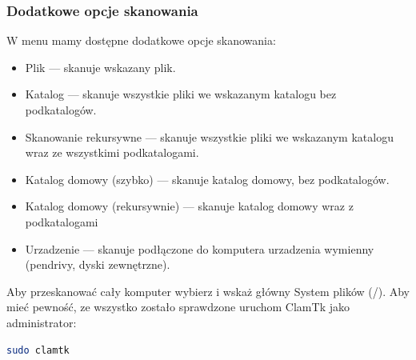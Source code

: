 \subsubsection{Dodatkowe opcje skanowania}
W menu  mamy dostępne dodatkowe opcje skanowania:
\begin{itemize}
\item \textcolor{ubuntu_orange}{Plik} --- skanuje wskazany plik.
\item \textcolor{ubuntu_orange}{Katalog} --- skanuje wszystkie pliki we wskazanym katalogu bez podkatalogów.
\item \textcolor{ubuntu_orange}{Skanowanie rekursywne} --- skanuje wszystkie pliki we wskazanym katalogu wraz ze wszystkimi podkatalogami.
\item \textcolor{ubuntu_orange}{Katalog domowy (szybko)} --- skanuje katalog domowy, bez podkatalogów.
\item \textcolor{ubuntu_orange}{Katalog domowy (rekursywnie)} --- skanuje katalog domowy wraz z podkatalogami
\item \textcolor{ubuntu_orange}{Urzadzenie} --- skanuje podłączone do komputera urzadzenia wymienny (pendrivy, dyski zewnętrzne).
\end{itemize}

Aby przeskanować cały komputer wybierz  i wskaż główny \textcolor{ubuntu_orange}{System plików} (/). Aby mieć pewność, ze wszystko zostało sprawdzone uruchom ClamTk jako administrator:
\begin{lstlisting}[language=bash]
sudo clamtk
\end{lstlisting}